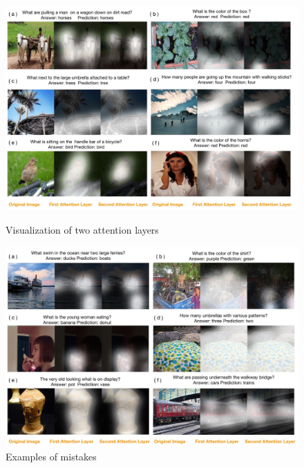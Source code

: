 \documentclass[10pt,twocolumn,letterpaper]{article}
\begin{document}
\begin{figure}[!tbhp]
  \vspace{-0.5cm}
  \centering
  \begin{minipage}{\textwidth}
      \centering
      \includegraphics[width=0.95\linewidth] {visualization_correct.jpg}
      \centering
      \caption{Visualization of two attention layers}
      \label{fig:vqa_more_examples}
  \end{minipage}
  \centering
  \begin{minipage}{\textwidth}
    \includegraphics[width=0.95\linewidth] {visualization_wrong.jpg}
    \centering
    \caption{Examples of mistakes}
    \label{fig:vqa_wrong_examples}
  \end{minipage}
\end{figure}
\end{document}
